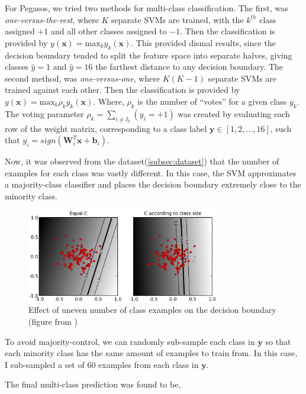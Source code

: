 \documentclass[fleqn]{article}
\begin{document}
For Pegasos, we tried two methods for multi-class classification.  The first, was \textit{one-versus-the-rest}\cite{vapnik:1998}, where $K$ separate SVMs are trained, with the $k^{th}$ class assigned $+1$ and all other classes assigned to $-1$.  Then the classification is provided by $y(\mathbf{x}) = \text{max}_k y_k (\mathbf{x})$.  This provided dismal results, since the decision boundary tended to split the feature space into separate halves, giving classes $\widehat{y} = 1$ and $\widehat{y} = 16$ the farthest distance to any decision boundary. The second method, was \textit{one-versus-one}\cite{vapnik:1998}, where $K(K-1)$ separate SVMs are trained against each other.  Then the classification is provided by $y(\mathbf{x}) = \text{max}_k \rho_k y_k (\mathbf{x})$.  Where, $\rho_k$ is the number of ``votes'' for a given class $y_k$. The voting parameter $\rho_k = \sum_{i \neq I_k} (y_i = +1)$ was created by evaluating each row of the weight matrix, corresponding to a class label $\mathbf{y} \in [1,2,\dots,16]$, such that $y_i = sign(\mathbf{W}_i^T \mathbf{x} + \mathbf{b}_i)$.  

Now, it was observed from the dataset(\ref{subsec:dataset}) that the number of examples for each class was vastly different.  In this case, the SVM approximates a majority-class classifier and places the decision boundary extremely close to the minority class.
%
\begin{figure}[H]
	{\centering
		\includegraphics[trim = 2mm 2mm 2mm 2mm, clip,width=0.75\textwidth]{figs/DifferentC}
		\caption{Effect of uneven number of class examples on the decision boundary (figure from \cite{UsersGuideSVM})}
		\label{fig:Different_SVM_C_size}
	}
\end{figure}
%
To avoid majority-control, we can randomly sub-sample each class in $\mathbf{y}$ so that each minority class has the same amount of examples to train from.  In this case, I sub-sampled a set of 60 examples from each class in $\mathbf{y}$.

The final multi-class prediction was found to be,
\end{document}

